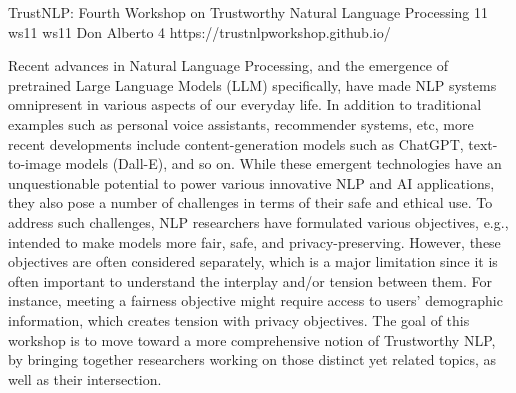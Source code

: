 \begin{wsschedulenolist}
{TrustNLP: Fourth Workshop on Trustworthy Natural Language Processing}
{11}
{ws11}
{ws11}
{Don Alberto 4}
{https://trustnlpworkshop.github.io/}

Recent advances in Natural Language Processing, and the emergence of pretrained Large Language Models (LLM) specifically, have made NLP systems omnipresent in various aspects of our everyday life. In addition to traditional examples such as personal voice assistants, recommender systems, etc, more recent developments include content-generation models such as ChatGPT, text-to-image models (Dall-E), and so on. While these emergent technologies have an unquestionable potential to power various innovative NLP and AI applications, they also pose a number of challenges in terms of their safe and ethical use. To address such challenges, NLP researchers have formulated various objectives, e.g., intended to make models more fair, safe, and privacy-preserving. However, these objectives are often considered separately, which is a major limitation since it is often important to understand the interplay and/or tension between them. For instance, meeting a fairness objective might require access to users’ demographic information, which creates tension with privacy objectives. The goal of this workshop is to move toward a more comprehensive notion of Trustworthy NLP, by bringing together researchers working on those distinct yet related topics, as well as their intersection.

\end{wsschedulenolist}
